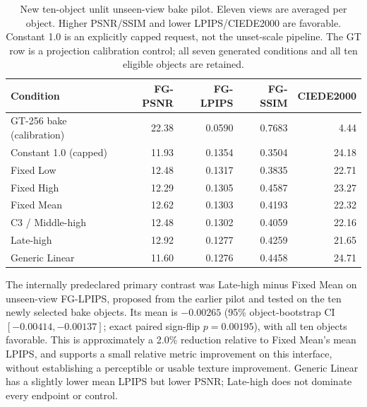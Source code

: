 \documentclass[times,twocolumn,final]{elsarticle}
\providecommand{\DIFadd}[1]{{\protect\color{blue} \sf #1}} %
\providecommand{\DIFaddbegin}{} %
\providecommand{\DIFaddend}{} %
\providecommand{\DIFaddFL}[1]{\DIFadd{#1}} %
\providecommand{\DIFaddbeginFL}{\DIFaddbegin} %
\providecommand{\DIFaddendFL}{\DIFaddend} %
\renewcommand{\DIFaddbeginFL}{}
\renewcommand{\DIFaddendFL}{}
\renewcommand{\DIFaddFL}[1]{#1}
\begin{document}
\begin{table}[ht]
\centering\scriptsize
\caption{New ten-object unlit unseen-view bake pilot. Eleven views are averaged per object. Higher PSNR/SSIM and lower LPIPS/CIEDE2000 are favorable. Constant 1.0 is an explicitly capped request, not the unset-scale pipeline. The GT row is a projection calibration control; all seven generated conditions and all ten eligible objects are retained.}
\label{tab:new-bake}
\begin{tabular}{lrrrr}
\DIFaddendFL \toprule   \DIFaddbeginFL \DIFaddFL{Condition }\DIFaddendFL &   \DIFaddbeginFL \DIFaddFL{FG-PSNR }\DIFaddendFL &   \DIFaddbeginFL \DIFaddFL{FG-LPIPS }\DIFaddendFL &   \DIFaddbeginFL \DIFaddFL{FG-SSIM }& \DIFaddFL{CIEDE2000 }\DIFaddendFL \\
\midrule
  \DIFaddbeginFL \DIFaddFL{GT-256 bake (calibration) }\DIFaddendFL &   \DIFaddbeginFL \DIFaddFL{22.38 }\DIFaddendFL &   \DIFaddbeginFL \DIFaddFL{0.0590 }\DIFaddendFL &   \DIFaddbeginFL \DIFaddFL{0.7683 }& \DIFaddFL{4.44 }\DIFaddendFL \\
  \DIFaddbeginFL \DIFaddFL{Constant 1.0 (capped) }\DIFaddendFL &   \DIFaddbeginFL \DIFaddFL{11.93 }\DIFaddendFL &   \DIFaddbeginFL \DIFaddFL{0.1354 }\DIFaddendFL &   \DIFaddbeginFL \DIFaddFL{0.3504 }& \DIFaddFL{24.18 }\\
\DIFaddFL{Fixed Low }& \DIFaddFL{12.48 }& \DIFaddFL{0.1317 }& \DIFaddFL{0.3835 }& \DIFaddFL{22.71 }\\
\DIFaddFL{Fixed High }& \DIFaddFL{12.29 }& \DIFaddFL{0.1305 }& \DIFaddFL{0.4587 }& \DIFaddFL{23.27 }\\
\DIFaddFL{Fixed Mean }& \DIFaddFL{12.62 }& \DIFaddFL{0.1303 }& \DIFaddFL{0.4193 }& \DIFaddFL{22.32 }\DIFaddendFL \\
C3   \DIFaddbeginFL \DIFaddFL{/ Middle-high }\DIFaddendFL &   \DIFaddbeginFL \DIFaddFL{12.48 }\DIFaddendFL &   \DIFaddbeginFL \DIFaddFL{0.1302 }\DIFaddendFL &   \DIFaddbeginFL \DIFaddFL{0.4059 }& \DIFaddFL{22.16 }\\
\DIFaddFL{Late-high }& \DIFaddFL{12.92 }& \DIFaddFL{0.1277 }& \DIFaddFL{0.4259 }& \DIFaddFL{21.65 }\\
\DIFaddFL{Generic Linear }& \DIFaddFL{11.60 }& \DIFaddFL{0.1276 }& \DIFaddFL{0.4458 }& \DIFaddFL{24.71 }\DIFaddendFL \\
\bottomrule\end{tabular}
\end{table}

  \DIFaddbegin \DIFadd{The internally predeclared primary contrast was Late-high minus Fixed Mean on unseen-view FG-LPIPS, proposed from the earlier pilot and tested on the ten newly selected bake objects. Its mean is $-0.00265$ (95\% object-bootstrap CI $[-0.00414,-0.00137]$; exact paired sign-flip $p=0.00195$), with all ten objects favorable. This is approximately a 2.0\% reduction relative to Fixed Mean's mean LPIPS, and supports a small relative metric improvement on this interface, without establishing a perceptible or usable texture improvement. Generic Linear has a slightly lower mean LPIPS but lower PSNR; Late-high does not dominate every endpoint or control.
}
\end{document}
